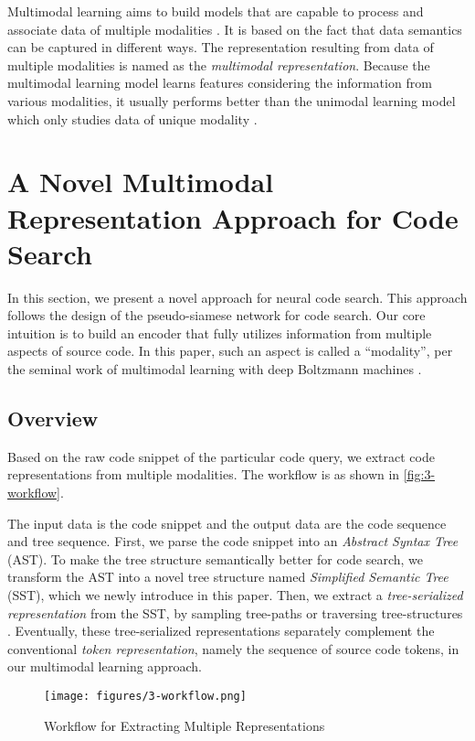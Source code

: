 \documentclass[conference]{IEEEtran}
\begin{document}
Multimodal learning aims to build models that are capable to process and associate data of multiple modalities \cite{Baltruaitis2019MultimodalML}. It is based on the fact that data semantics can be captured in different ways. The representation resulting from data of multiple modalities is named as the \emph{multimodal representation}. Because the multimodal learning model learns features considering the information from various modalities, it usually performs better than the unimodal learning model which only studies data of unique modality \cite{Ngiam2011MultimodalDL}.
 \section{A Novel Multimodal Representation Approach for Code Search}
\label{sec:approach}

In this section, we present a novel approach for neural code search. This approach follows the design of the pseudo-siamese network for code search.
Our core intuition is to build an encoder that fully utilizes information from multiple aspects of source code. In this paper, such an aspect is called a ``modality'', per the seminal work of multimodal learning with deep Boltzmann machines \cite{Srivastava2012MultimodalLW}.
\subsection{Overview}

Based on the raw code snippet of the particular code query, we extract code representations from multiple modalities. The workflow is as shown in \autoref{fig:3-workflow}.

The input data is the code snippet and the output data are the code sequence and tree sequence. First, we parse the code snippet into an \emph{Abstract Syntax Tree} (AST). To make the tree structure semantically better for code search, we transform the AST into a novel tree structure named \emph{Simplified Semantic Tree} (SST), which we newly introduce in this paper. Then, we extract a \emph{tree-serialized representation} from the SST, by sampling tree-paths \cite{Alon2018AGP,Kim2020CodePB} or traversing tree-structures \cite{Hu2018DeepCC,Chen2018TreetotreeNN}. Eventually, these tree-serialized representations separately complement the conventional \emph{token representation}, namely the sequence of source code tokens, in our multimodal learning approach.

\begin{figure}[!htb]
  \centering
  \texttt{[image: figures/3-workflow.png]}
  \caption{Workflow for Extracting Multiple Representations}
  \label{fig:3-workflow}
\end{figure}
\end{document}
